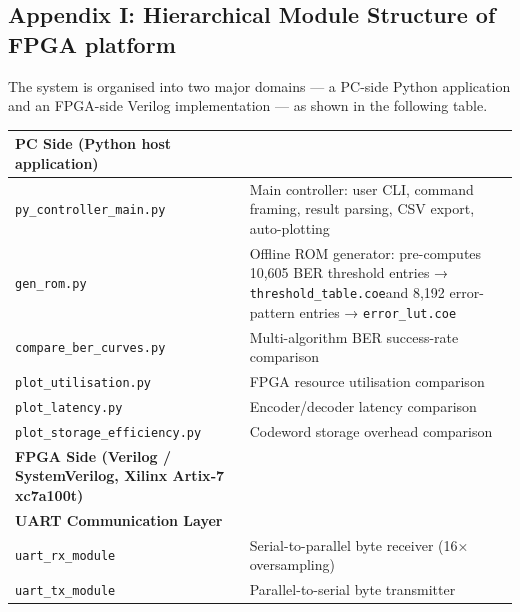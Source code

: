 \subsection{Appendix I: Hierarchical Module Structure of FPGA
platform}\label{appendix-i-hierarchical-module-structure-of-fpga-platform}

The system is organised into two major domains --- a PC-side Python
application and an FPGA-side Verilog implementation --- as shown in the
following table.

{\def\LTcaptype{none} %
\begin{longtable}[]{@{}
  >{\raggedright\arraybackslash}p{}
  >{\raggedright\arraybackslash}p{}@{}}
\toprule\noalign{}
\begin{minipage}[b]{\linewidth}\raggedright
\textbf{PC Side (Python host application)}\hspace{0pt}
\end{minipage} & \begin{minipage}[b]{\linewidth}\raggedright
\end{minipage} \\
\midrule\noalign{}
\endhead
\bottomrule\noalign{}
\endlastfoot
\texttt{py\_controller\_main.py} & Main controller: user CLI, command
framing, result parsing, CSV export, auto-plotting \\
\texttt{gen\_rom.py} & Offline ROM generator: pre-computes 10,605 BER
threshold entries → \texttt{threshold\_table.coe}and 8,192 error-pattern
entries → \texttt{error\_lut.coe} \\
\texttt{compare\_ber\_curves.py} & Multi-algorithm BER success-rate
comparison \\
\texttt{plot\_utilisation.py} & FPGA resource utilisation comparison \\
\texttt{plot\_latency.py} & Encoder/decoder latency comparison \\
\texttt{plot\_storage\_efficiency.py} & Codeword storage overhead
comparison \\
\textbf{FPGA Side (Verilog / SystemVerilog, Xilinx Artix‑7
xc7a100t)}\hspace{0pt} & \\
\textbf{UART Communication Layer}\hspace{0pt} & \\
\texttt{uart\_rx\_module} & Serial-to-parallel byte receiver (16×
oversampling) \\
\texttt{uart\_tx\_module} & Parallel-to-serial byte transmitter \\

\end{longtable}}
